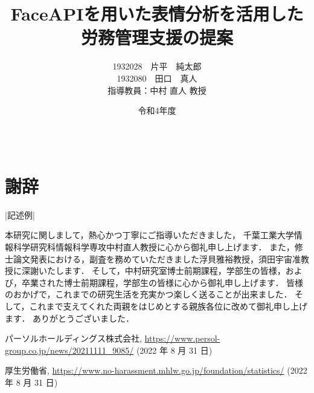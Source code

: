 \documentclass[12pt]{ltjsreport}%
\title{FaceAPIを用いた表情分析を活用した\\労務管理支援の提案}					%
\author{1932028　片平　純太郎\\1932080　田口　真人\\\normalsize 指導教員：中村 直人 教授}	%
\date{令和4年度}                                %
\begin{document}
\maketitle                          %
\tableofcontents                 %
\listoffigures				 %
\listoftables				 %

\baselineskip 20pt               %


\clearpage
{}


%










\newpage



\chapter*{　\\謝辞}
|記述例|

本研究に関しまして，熱心かつ丁寧にご指導いただきました，
千葉工業大学情報科学研究科情報科学専攻中村直人教授に心から御礼申し上げます．
また，修士論文発表における，副査を務めていただきました浮貝雅裕教授，須田宇宙准教授に深謝いたします．
そして，中村研究室博士前期課程，学部生の皆様，および，卒業された博士前期課程，学部生の皆様に心から御礼申し上げます．
皆様のおかげで，これまでの研究生活を充実かつ楽しく送ることが出来ました．
そして，これまで支えてくれた両親をはじめとする親族各位に改めて御礼申し上げます．
ありがとうございました．


\begin{thebibliography}{99}

パーソルホールディングス株式会社,
\url{https://www.persol-group.co.jp/news/20211111_9085/} (2022 年 8 月 31 日)

厚生労働省,
\url{https://www.no-harassment.mhlw.go.jp/foundation/statistics/} (2022 年 8 月 31 日)

\end{thebibliography}
\end{document}
